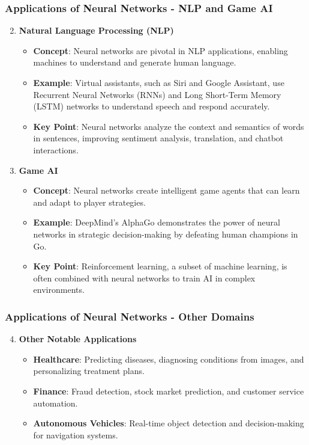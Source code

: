 \documentclass[aspectratio=169]{beamer}
\begin{document}
\begin{frame}[fragile]
    \frametitle{Applications of Neural Networks - NLP and Game AI}
    \begin{enumerate}
        \setcounter{enumi}{1}
        \item \textbf{Natural Language Processing (NLP)}
        \begin{itemize}
            \item \textbf{Concept}: Neural networks are pivotal in NLP applications, enabling machines to understand and generate human language.
            \item \textbf{Example}: Virtual assistants, such as Siri and Google Assistant, use Recurrent Neural Networks (RNNs) and Long Short-Term Memory (LSTM) networks to understand speech and respond accurately.
            \item \textbf{Key Point}: Neural networks analyze the context and semantics of words in sentences, improving sentiment analysis, translation, and chatbot interactions.
        \end{itemize}
        
        \item \textbf{Game AI}
        \begin{itemize}
            \item \textbf{Concept}: Neural networks create intelligent game agents that can learn and adapt to player strategies.
            \item \textbf{Example}: DeepMind's AlphaGo demonstrates the power of neural networks in strategic decision-making by defeating human champions in Go.
            \item \textbf{Key Point}: Reinforcement learning, a subset of machine learning, is often combined with neural networks to train AI in complex environments.
        \end{itemize}
    \end{enumerate}
\end{frame}

\begin{frame}[fragile]
    \frametitle{Applications of Neural Networks - Other Domains}
    \begin{enumerate}
        \setcounter{enumi}{3}
        \item \textbf{Other Notable Applications}
        \begin{itemize}
            \item \textbf{Healthcare}: Predicting diseases, diagnosing conditions from images, and personalizing treatment plans.
            \item \textbf{Finance}: Fraud detection, stock market prediction, and customer service automation.
            \item \textbf{Autonomous Vehicles}: Real-time object detection and decision-making for navigation systems.
        \end{itemize}
        
    \end{enumerate}
\end{frame}
\end{document}
